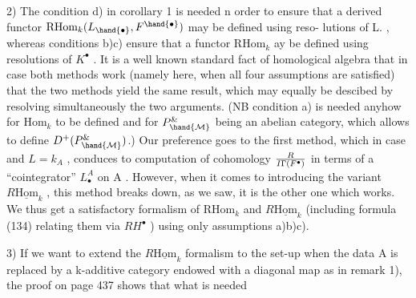 2) The condition d) in corollary 1 is needed n order to ensure
 that a derived functor $\mathrm{RHom}_k(L_{\hand{\bullet}},F^{\hand{\bullet}})$ may be defined using \hand{\uline{\textcolor{black}{projective}}} reso-%
lutions of L. , whereas conditions b)\hand{,}c) ensure that a functor
$\mathrm{RHom}_k$ ay be defined using  \hand{\uline{\textcolor{black}{injective}}} resolutions of $K^\bullet$ . It is
a well known standard fact of homological algebra that in case both
methods work (namely here, when all four assumptions are satisfied)
that the two methods yield the same result, which may equally be
descibed by resolving simultaneously the two arguments. (NB condition
a) is needed anyhow for $\mathrm{Hom}_k$ to be defined and for $P^{\&}_{\hand{\mathcal{M}}}$ being an abelian
category, which allows to define $D^+(P^{\&}_{\hand{\mathcal{M}}})$.) Our preference goes to
the first method, which in case   and $L = k_A$ , conduces to
computation of cohomology $R\over{I}{\Gamma}(F^\bullet)$ in terms of a ``cointegrator'' $L_\bullet^A$ on
A . However, when it comes to introducing the variant $R\underline{\mathrm{Hom}}_k$ , this
method breaks down, as we saw, it is the other one which works. We
thus get a satisfactory formalism of $\mathrm{RHom}_k$ and $R\underline{\mathrm{Hom}}_k$ (including formula
(134) relating them via $RH^\bullet$ ) using only assumptions a)b)c).

3) If we want to extend the $R\underline{\mathrm{Hom}}_k$ formalism to the set-up when
the data A is replaced by a k-additive category  endowed with a diagonal
map as in remark 1), the proof on page 437 shows that what is needed

